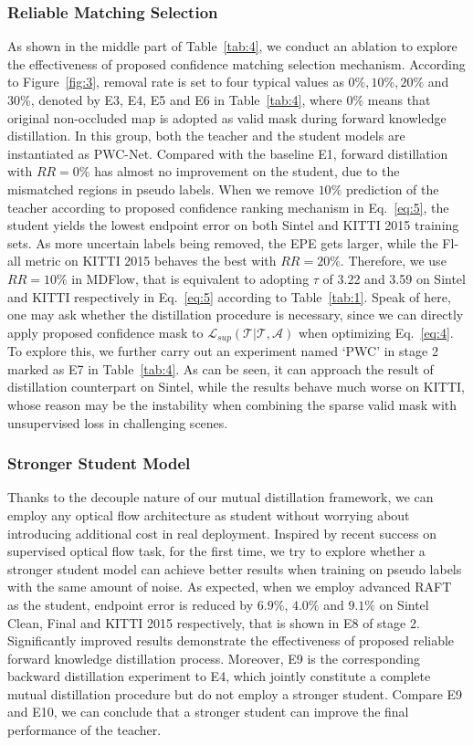 \documentclass[lettersize,journal]{IEEEtran}
\begin{document}
\subsubsection{Reliable Matching Selection}
As shown in the middle part of Table~\ref{tab:4}, we conduct an ablation to explore the effectiveness of proposed confidence matching selection mechanism. According to Figure~\ref{fig:3}, removal rate is set to four typical values as $0\%, 10\%, 20\%$ and $30\%$, denoted by E3, E4, E5 and E6 in Table~\ref{tab:4}, where $0\%$ means that original non-occluded map is adopted as valid mask during forward knowledge distillation. In this group, both the teacher and the student models are instantiated as PWC-Net. Compared with the baseline E1, forward distillation with $RR=0\%$ has almost no improvement on the student, due to the mismatched regions in pseudo labels. When we remove $10\%$ prediction of the teacher according to proposed confidence ranking mechanism in Eq.~\ref{eq:5}, the student yields the lowest endpoint error on both Sintel and KITTI 2015 training sets. As more uncertain labels being removed, the EPE gets larger, while the Fl-all metric on KITTI 2015 behaves the best with $RR=20\%$. Therefore, we use $RR=10\%$ in MDFlow, that is equivalent to adopting $\tau$ of 3.22 and 3.59 on Sintel and KITTI respectively in Eq.~\ref{eq:5} according to Table~\ref{tab:1}. Speak of here, one may ask whether the distillation procedure is necessary, since we can directly apply proposed confidence mask to $\mathcal{L}_{sup}(\mathcal{T} | \mathcal{T}, \mathcal{A})$ when optimizing Eq.~\ref{eq:4}. To explore this, we further carry out an experiment named `PWC' in stage 2 marked as E7 in Table~\ref{tab:4}. As can be seen, it can approach the result of distillation counterpart on Sintel, while the results behave much worse on KITTI, whose reason may be the instability when combining the sparse valid mask with unsupervised loss in challenging scenes.

\subsubsection{Stronger Student Model}
Thanks to the decouple nature of our mutual distillation framework, we can employ any optical flow architecture as student without worrying about introducing additional cost in real deployment. Inspired by recent success on supervised optical flow task, for the first time, we try to explore whether a stronger student model can achieve better results when training on pseudo labels with the same amount of noise. As expected, when we employ advanced RAFT~\cite{teed2020raft} as the student, endpoint error is reduced by $6.9\%$, $4.0\%$ and $9.1\%$ on Sintel Clean, Final and KITTI 2015 respectively, that is shown in E8 of stage 2. Significantly improved results demonstrate the effectiveness of proposed reliable forward knowledge distillation process. Moreover, E9 is the corresponding backward distillation experiment to E4, which jointly constitute a complete mutual distillation procedure but do not employ a stronger student. Compare E9 and E10, we can conclude that a stronger student can improve the final performance of the teacher.
\end{document}
